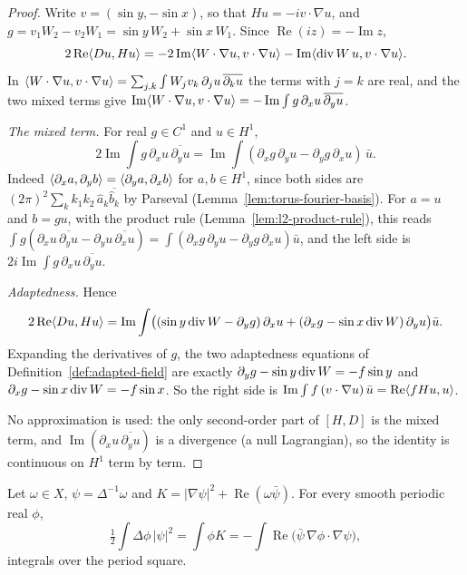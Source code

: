 \begin{proof}
\leanok
Write $v=(\sin y,-\sin x)$, so that $Hu=-iv\cdot\nabla u$, and $g=v_1W_2-v_2W_1
=\sin y\,W_2+\sin x\,W_1$. Since $\operatorname{Re}(iz)=-\operatorname{Im}z$,
\[
  2\operatorname{Re}\langle Du,Hu\rangle
  =-2\operatorname{Im}\langle W\cdot\nabla u,v\cdot\nabla u\rangle
   -\operatorname{Im}\langle \operatorname{div} W\,u,v\cdot\nabla u\rangle.
\]
In $\langle W\cdot\nabla u,v\cdot\nabla u\rangle=\sum_{j,k}\int W_jv_k\,\partial_ju\,\overline{\partial_ku}$
the terms with $j=k$ are real, and the two mixed terms give
$\operatorname{Im}\langle W\cdot\nabla u,v\cdot\nabla u\rangle
=-\operatorname{Im}\int g\,\partial_xu\,\overline{\partial_yu}$.

\emph{The mixed term.} For real $g\in C^1$ and $u\in H^1$,
\[
  2\operatorname{Im}\int g\,\partial_xu\,\overline{\partial_yu}
  =\operatorname{Im}\int(\partial_xg\,\partial_yu-\partial_yg\,\partial_xu)\,\bar u .
\]
Indeed $\langle \partial_xa,\partial_yb\rangle=\langle \partial_ya,\partial_xb\rangle$ for $a,b\in H^1$, since
both sides are $(2\pi)^2\sum_kk_1k_2\,\hat a_k\overline{\hat b_k}$ by Parseval
(Lemma~\ref{lem:torus-fourier-basis}). For $a=u$ and $b=gu$, with the product rule
(Lemma~\ref{lem:l2-product-rule}), this reads
$\int g(\partial_xu\,\overline{\partial_yu}-\partial_yu\,\overline{\partial_xu})
=\int(\partial_xg\,\partial_yu-\partial_yg\,\partial_xu)\bar u$, and the left side is
$2i\operatorname{Im}\int g\,\partial_xu\,\overline{\partial_yu}$.

\emph{Adaptedness.} Hence
\[
  2\operatorname{Re}\langle Du,Hu\rangle
  =\operatorname{Im}\int\bigl((\sin y\operatorname{div} W-\partial_yg)\,\partial_xu
    +(\partial_xg-\sin x\operatorname{div} W)\,\partial_yu\bigr)\bar u .
\]
Expanding the derivatives of $g$, the two adaptedness equations of
Definition~\ref{def:adapted-field} are exactly
$\partial_yg-\sin y\operatorname{div} W=-f\sin y$ and $\partial_xg-\sin x\operatorname{div} W=-f\sin x$. So the right
side is $\operatorname{Im}\int f\,(v\cdot\nabla u)\,\bar u
=\operatorname{Re}\langle fHu,u\rangle$.

No approximation is used: the only second-order part of $[H,D]$ is the mixed term, and
$\operatorname{Im}(\partial_xu\,\overline{\partial_yu})$ is a divergence (a null
Lagrangian), so the identity is continuous on $H^1$ term by term.
\end{proof}

\begin{lemma}
\label{lem:stream-ibp}
\leanok
Let $\omega\in X$, $\psi=\Delta^{-1}\omega$ and $K=|\nabla\psi|^2+\operatorname{Re}(\omega\bar\psi)$. For
every smooth periodic real $\phi$,
\[
  \tfrac12\int\Delta\phi\,|\psi|^2=\int\phi K=-\int\operatorname{Re}\bigl(\bar\psi\,\nabla\phi\cdot\nabla\psi\bigr),
\]
integrals over the period square.
\end{lemma}

